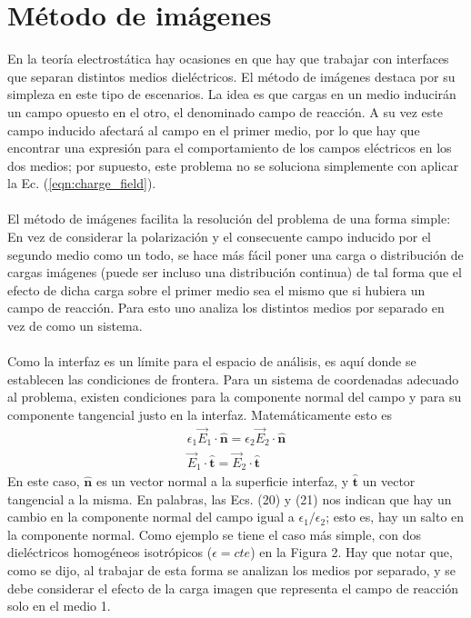 \documentclass[12pt, oneside, numbers, spanish]{ezthesis}
\numberwithin{equation}{section}
\begin{document}
\section{Método de imágenes}\label{Sec:Image_Method}
En la teoría electrostática hay ocasiones en que hay que trabajar con interfaces que separan distintos medios dieléctricos. El método de imágenes destaca por su simpleza en este tipo de escenarios. La idea es que cargas en un medio inducirán un campo opuesto en el otro, el denominado campo de reacción. A su vez este campo inducido afectará al campo en el primer medio, por lo que hay que encontrar una expresión para el comportamiento de los campos eléctricos en los dos medios; por supuesto, este problema no se soluciona simplemente con aplicar la Ec. (\ref{eqn:charge_field}).\\\\
El método de imágenes facilita la resolución del problema de una forma simple: En vez de considerar la polarización y el consecuente campo inducido por el segundo medio como un todo, se hace más fácil poner una carga o distribución de cargas imágenes (puede ser incluso una distribución continua) de tal forma que el efecto de dicha carga sobre el primer medio sea el mismo que si hubiera un campo de reacción. Para esto uno analiza los distintos medios por separado en vez de como un sistema.\\\\
Como la interfaz es un límite para el espacio de análisis, es aquí donde se establecen las condiciones de frontera. Para un sistema de coordenadas adecuado al problema, existen condiciones para la componente normal del campo y para su componente tangencial justo en la interfaz. Matemáticamente esto es
\begin{gather}
\epsilon_1\vec{E}_1\cdot\hat{\mathbf{n}} = \epsilon_2\vec{E}_2\cdot\hat{\mathbf{n}} \label{eqn:jump_condition}\\
\vec{E}_1\cdot\hat{\mathbf{t}} = \vec{E}_2\cdot\hat{\mathbf{t}} \label{eqn:pot_continuity}
\end{gather}
En este caso, $\hat{\mathbf{n}}$ es un vector normal a la superficie interfaz, y $\hat{\mathbf{t}}$ un vector tangencial a la misma. En palabras, las Ecs. (20) y (21) nos indican que hay un cambio en la componente normal del campo igual a $\epsilon_1/\epsilon_2$; esto es, hay un salto en la componente normal. Como ejemplo se tiene el caso más simple, con dos dieléctricos homogéneos isotrópicos ($\epsilon = cte$) en la Figura 2. Hay que notar que, como se dijo, al trabajar de esta forma se analizan los medios por separado, y se debe considerar el efecto de la carga imagen que representa el campo de reacción solo en el medio 1.
\end{document}
